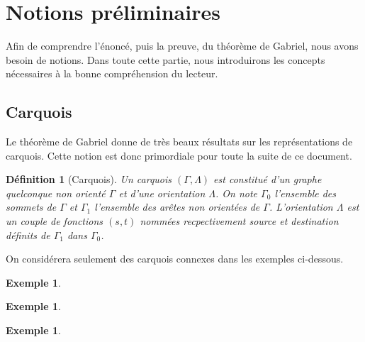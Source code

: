 \documentclass[a4paper,11pt]{article}
\newtheorem{defi}[thm]{Définition}%
\newtheorem{ex}[thm]{Exemple}%
\begin{document}
\section{Notions préliminaires}
Afin de comprendre l'énoncé, puis la preuve, du théorème de Gabriel, nous avons besoin de notions. Dans toute cette partie, nous introduirons les concepts nécessaires à la bonne compréhension du lecteur.

\subsection{Carquois}
Le théorème de Gabriel donne de très beaux résultats sur les représentations de carquois. Cette notion est donc primordiale pour toute la suite de ce document.
\begin{defi}[Carquois]
	\label{carquois}
	Un \emph{carquois} $(\Gamma,\Lambda)$ est constitué d'un graphe quelconque non orienté $\Gamma$ et d'une orientation $\Lambda$. On note  $\Gamma_0$ l'ensemble des sommets de $\Gamma$ et $\Gamma_1$ l'ensemble des arêtes non orientées de $\Gamma$. L'orientation $\Lambda$ est un couple de fonctions $(s,t)$ nommées recpectivement source et destination définits de $\Gamma_1$ dans $\Gamma_0$. 
\end{defi}
On considérera seulement des carquois connexes dans les exemples ci-dessous.
	\begin{ex}
		\label{carquois_simple}
	\end{ex}
	\begin{ex}
		\label{carquois_boucle}
	\end{ex}
	\begin{ex}
	\end{ex}
\end{document}
